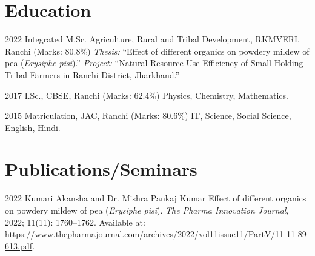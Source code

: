 \documentclass[A4]{twentysecondcv} %
\begin{document}
\section{Education}

\begin{twenty}

	\twentyitem
	{2022}
	{Integrated M.Sc. Agriculture, Rural and Tribal Development, RKMVERI, Ranchi (Marks: 80.8\%)}
	{}
	{\emph{Thesis:} “Effect of different organics on powdery mildew of pea (\textit{Erysiphe pisi}).”
	 \emph{Project:} “Natural Resource Use Efficiency of Small Holding Tribal Farmers in Ranchi District, Jharkhand.”}

	\twentyitem
	{2017}
	{I.Sc., CBSE, Ranchi (Marks: 62.4\%)}
	{}
	{Physics, Chemistry, Mathematics.}

    \twentyitem
    {2015}
    {Matriculation, JAC, Ranchi (Marks: 80.6\%)}
    {}
    {IT, Science, Social Science, English, Hindi.}

\end{twenty}


\section{Publications/Seminars}

\begin{twenty} %
    \twentyitem
    {2022}
    {Kumari Akansha and Dr. Mishra Pankaj Kumar}
    {}
    {Effect of different organics on powdery mildew of pea (\textit{Erysiphe pisi}). 
    \textit{The Pharma Innovation Journal}, 2022; 11(11): 1760--1762. 
    Available at: \url{https://www.thepharmajournal.com/archives/2022/vol11issue11/PartV/11-11-89-613.pdf}.}
\end{twenty}

\end{document}
